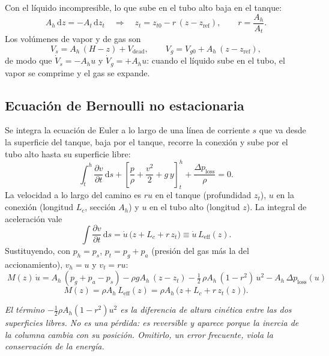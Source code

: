 \documentclass[11pt,a4paper]{article}
\newcommand{\dd}{\mathrm{d}}
\newenvironment{nota}{\par\smallskip\noindent\begin{minipage}{\linewidth}\small\itshape}{\end{minipage}\par\smallskip}
\begin{document}
Con el líquido incompresible, lo que sube en el tubo alto baja en el tanque:
\begin{equation}
A_h\,\dd z = -A_t\,\dd z_t \quad\Longrightarrow\quad z_t = z_{t0} - r\,(z - z_{\mathrm{ref}}),\qquad r=\frac{A_h}{A_t}.
\label{eq:volumen}
\end{equation}
Los volúmenes de vapor y de gas son
\begin{equation}
V_s = A_h\,(H - z) + V_{\mathrm{dead}},\qquad V_g = V_{g0} + A_h\,(z-z_{\mathrm{ref}}),
\end{equation}
de modo que $\dot V_s = -A_h u$ y $\dot V_g = +A_h u$: cuando el líquido sube en el tubo, el vapor se comprime y el gas se expande.

\subsection{Ecuación de Bernoulli no estacionaria}

Se integra la ecuación de Euler a lo largo de una línea de corriente $s$ que va desde la superficie del tanque, baja por el tanque, recorre la conexión y sube por el tubo alto hasta su superficie libre:
\begin{equation}
\int_{t}^{h}\frac{\partial v}{\partial t}\,\dd s + \left[\frac{p}{\rho} + \frac{v^2}{2} + g\,y\right]_{t}^{h} + \frac{\Delta p_{\mathrm{loss}}}{\rho} = 0 .
\label{eq:bernoulli}
\end{equation}
La velocidad a lo largo del camino es $r u$ en el tanque (profundidad $z_t$), $u$ en la conexión (longitud $L_c$, sección $A_h$) y $u$ en el tubo alto (longitud $z$). La integral de aceleración vale
\begin{equation}
\int \frac{\partial v}{\partial t}\,\dd s = \dot u\,\bigl(z + L_c + r\,z_t\bigr) \equiv \dot u\,L_{\mathrm{eff}}(z).
\end{equation}
Sustituyendo, con $p_h = p_s$, $p_t = p_g + p_a$ (presión del gas más la del accionamiento), $v_h = u$ y $v_t = r u$:
\begin{equation}
\boxed{\;M(z)\,\dot u = A_h\,(p_g + p_a - p_s) - \rho g A_h\,(z - z_t) - \tfrac12\,\rho A_h\,(1-r^2)\,u^2 - A_h\,\Delta p_{\mathrm{loss}}(u)\;}
\label{eq:movimiento}
\end{equation}
\begin{equation}
M(z) = \rho A_h\,L_{\mathrm{eff}}(z) = \rho A_h\,\bigl(z + L_c + r\,z_t(z)\bigr).
\end{equation}

\begin{nota}
El término $-\tfrac12\rho A_h(1-r^2)u^2$ es la diferencia de altura cinética entre las dos superficies libres. No es una pérdida: es reversible y aparece porque la inercia de la columna cambia con su posición. Omitirlo, un error frecuente, viola la conservación de la energía.
\end{nota}
\end{document}
